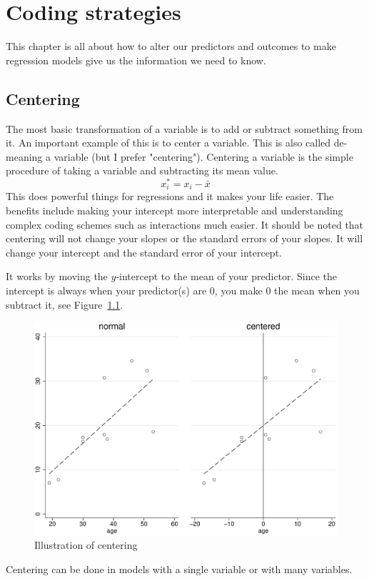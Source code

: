

\chapter{Coding strategies}
This chapter is all about how to alter our predictors and outcomes to make regression models give us the information we need to know.
\section{Centering}
The most basic transformation of a variable is to add or subtract something from it. An important example of this is to center a variable. This is also called de-meaning a variable (but I prefer "centering"). Centering a variable is the simple procedure of taking a variable and subtracting its mean value.
\begin{equation}
x_i^{*}=x_i-\bar{x}
\end{equation}
This does powerful things for regressions and it makes your life easier. The benefits include making your intercept more interpretable and understanding complex coding schemes such as interactions much easier. It should be noted that centering will not change your slopes or the standard errors of your slopes. It will change your intercept and the standard error of your intercept.

It works by moving the $y$-intercept to the mean of your predictor. Since the intercept is always when your predictor(s) are 0, you make 0 the mean when you subtract it, see Figure~\ref{fig:centering_fit}.
\begin{figure}
   \centering
   \includegraphics[angle=0,
           width=.75\textwidth]{centering_fit.eps}
   \caption{Illustration of centering}
  \label{fig:centering_fit}
\end{figure}
Centering can be done in models with a single variable or with many variables.


